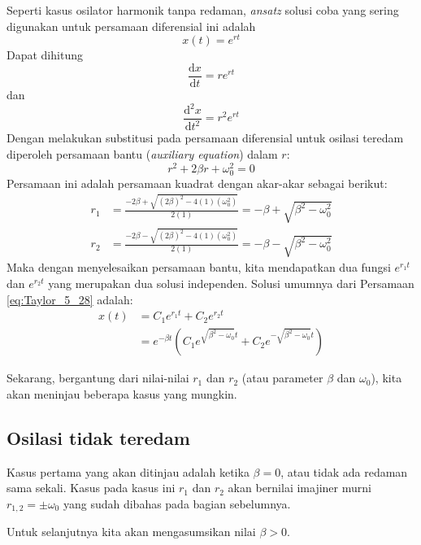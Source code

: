 Seperti kasus osilator harmonik tanpa redaman,
\textit{ansatz} solusi coba yang sering digunakan untuk persamaan diferensial ini adalah
\begin{equation*}
x(t) = e^{rt}
\end{equation*}
Dapat dihitung
\begin{equation*}
\frac{\mathrm{d}x}{\mathrm{d}t} = re^{rt}
\end{equation*}
dan
\begin{equation*}
\frac{\mathrm{d}^{2}x}{\mathrm{d}t^{2}} = r^{2}e^{rt}
\end{equation*}
Dengan melakukan substitusi pada persamaan diferensial untuk osilasi
teredam diperoleh persamaan bantu (\textit{auxiliary equation}) dalam $r$:
\begin{equation}
r^{2} + 2\beta r + \omega_{0}^{2} = 0
\end{equation}
Persamaan ini adalah persamaan kuadrat dengan akar-akar sebagai berikut:
\begin{align*}
r_{1} & =\frac{-2\beta + \sqrt{(2\beta)^{2} - 4(1)(\omega_{0}^{2})}}{2(1)} = -\beta+\sqrt{\beta^{2}-\omega_{0}^{2}}\\
r_{2} & =\frac{-2\beta - \sqrt{(2\beta)^{2} - 4(1)(\omega_{0}^{2})}}{2(1)} = -\beta-\sqrt{\beta^{2}-\omega_{0}^{2}}
\end{align*}
Maka dengan menyelesaikan persamaan bantu, kita mendapatkan dua fungsi $e^{r_{1}t}$ dan $e^{r_{2}t}$
yang merupakan dua solusi independen. 
Solusi umumnya dari Persamaan \eqref{eq:Taylor_5_28} adalah:
\begin{align*}
x(t) & = C_{1}e^{r_{1}t}+C_{2}e^{r_{2}t} \\
 & = e^{-\beta t} \left( C_1 e^{\sqrt{\beta^2 - \omega_0} t} + C_2 e^{ -\sqrt{\beta^2 - \omega_0} t} \right)
\end{align*}

Sekarang, bergantung dari nilai-nilai $r_1$ dan $r_2$ (atau parameter $\beta$ dan $\omega_0$),
kita akan meninjau beberapa kasus yang mungkin.


\subsection*{Osilasi tidak teredam}

Kasus pertama yang akan ditinjau adalah ketika $\beta = 0$, atau tidak ada redaman sama sekali.
Kasus pada kasus ini $r_1$ dan $r_2$ akan bernilai imajiner murni $r_{1,2} = \pm \omega_0$ yang
sudah dibahas pada bagian sebelumnya.

Untuk selanjutnya kita akan mengasumsikan nilai $\beta > 0$.

